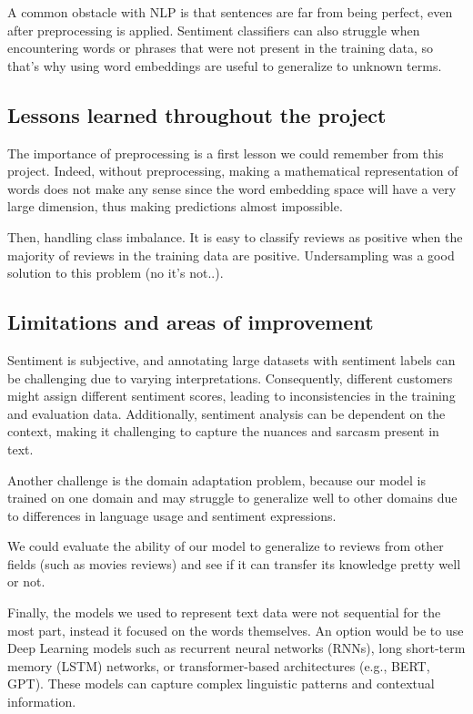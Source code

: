 \documentclass{article}
\begin{document}
A common obstacle with NLP is that sentences are far from being perfect, even after preprocessing is applied. Sentiment classifiers can also struggle when encountering words or phrases that were not present in the training data, so that's why using word embeddings are useful to generalize to unknown terms. 

\subsection{Lessons learned throughout the project}

The importance of preprocessing is a first lesson we could remember from this project. Indeed, without preprocessing, making a mathematical representation of words does not make any sense since the word embedding space will have a very large dimension, thus making predictions almost impossible.

Then, handling class imbalance. It is easy to classify reviews as positive when the majority of reviews in the training data are positive. Undersampling was a good solution to this problem (no it's not..). 

\subsection{Limitations and areas of improvement}

Sentiment is subjective, and annotating large datasets with sentiment labels can be challenging due to varying interpretations. Consequently, different customers might assign different sentiment scores, leading to inconsistencies in the training and evaluation data. Additionally, sentiment analysis can be dependent on the context, making it challenging to capture the nuances and sarcasm present in text. 

Another challenge is the domain adaptation problem, because our model is trained on one domain and may struggle to generalize well to other domains due to differences in language usage and sentiment expressions.

We could evaluate the ability of our model to generalize to reviews from other fields (such as movies reviews) and see if it can transfer its knowledge pretty well or not.

Finally, the models we used to represent text data were not sequential for the most part, instead it focused on the words themselves. An option would be to use Deep Learning models such as recurrent neural networks (RNNs), long short-term memory (LSTM) networks, or transformer-based architectures (e.g., BERT, GPT). These models can capture complex linguistic patterns and contextual information. 



\printbibliography
\end{document}
